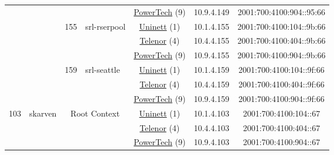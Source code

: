 \begin{small}
\begin{center}
\begin{longtable}{|c|c|c|c|c|c|c|c|}
  &  &  &  & \multicolumn{2}{|c|}{\tiny{\href{http://www.powertech.no}{PowerTech} (9)}} & \tiny{10.9.4.149} & \tiny{2001:700:4100:904::95:66} \\* \cline{3-3}\cline{4-4}\cline{5-5}\cline{6-6}\cline{7-7}\cline{8-8}
  &  & \multirow{3}{*}{\tiny{155}} & \multicolumn{1}{|l|}{\multirow{3}{*}{\tiny{srl-rserpool}}} & \multicolumn{2}{|c|}{\tiny{\href{https://www.uninett.no}{Uninett} (1)}} & \tiny{10.1.4.155} & \tiny{2001:700:4100:104::9b:66} \\* \cline{5-5}\cline{6-6}\cline{7-7}\cline{8-8}
  &  &  &  & \multicolumn{2}{|c|}{\tiny{\href{https://www.telenor.no}{Telenor} (4)}} & \tiny{10.4.4.155} & \tiny{2001:700:4100:404::9b:66} \\* \cline{5-5}\cline{6-6}\cline{7-7}\cline{8-8}
  &  &  &  & \multicolumn{2}{|c|}{\tiny{\href{http://www.powertech.no}{PowerTech} (9)}} & \tiny{10.9.4.155} & \tiny{2001:700:4100:904::9b:66} \\* \cline{3-3}\cline{4-4}\cline{5-5}\cline{6-6}\cline{7-7}\cline{8-8}
  &  & \multirow{3}{*}{\tiny{159}} & \multicolumn{1}{|l|}{\multirow{3}{*}{\tiny{srl-seattle}}} & \multicolumn{2}{|c|}{\tiny{\href{https://www.uninett.no}{Uninett} (1)}} & \tiny{10.1.4.159} & \tiny{2001:700:4100:104::9f:66} \\* \cline{5-5}\cline{6-6}\cline{7-7}\cline{8-8}
  &  &  &  & \multicolumn{2}{|c|}{\tiny{\href{https://www.telenor.no}{Telenor} (4)}} & \tiny{10.4.4.159} & \tiny{2001:700:4100:404::9f:66} \\* \cline{5-5}\cline{6-6}\cline{7-7}\cline{8-8}
  &  &  &  & \multicolumn{2}{|c|}{\tiny{\href{http://www.powertech.no}{PowerTech} (9)}} & \tiny{10.9.4.159} & \tiny{2001:700:4100:904::9f:66} \\ \hline
 \multirow{27}{*}{\tiny{103}} & \multicolumn{1}{|l|}{\multirow{27}{*}{\tiny{skarven}}} & \multicolumn{2}{|c|}{\multirow{3}{*}{\tiny{Root Context}}} & \multicolumn{2}{|c|}{\tiny{\href{https://www.uninett.no}{Uninett} (1)}} & \tiny{10.1.4.103} & \tiny{2001:700:4100:104::67} \\* \cline{5-5}\cline{6-6}\cline{7-7}\cline{8-8}
  &  & \multicolumn{2}{|c|}{} & \multicolumn{2}{|c|}{\tiny{\href{https://www.telenor.no}{Telenor} (4)}} & \tiny{10.4.4.103} & \tiny{2001:700:4100:404::67} \\* \cline{5-5}\cline{6-6}\cline{7-7}\cline{8-8}
  &  & \multicolumn{2}{|c|}{} & \multicolumn{2}{|c|}{\tiny{\href{http://www.powertech.no}{PowerTech} (9)}} & \tiny{10.9.4.103} & \tiny{2001:700:4100:904::67} \\* \cline{3-3}\cline{4-4}\cline{5-5}\cline{6-6}\cline{7-7}\cline{8-8}

\end{longtable}
\end{center}
\end{small}
